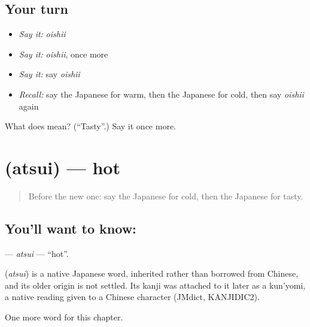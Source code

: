 \subsection*{Your turn}
\begin{itemize}
\raggedright
  \item \emph{Say it:} \emph{oishii}
  \item \emph{Say it:} \emph{oishii}, once more
  \item \emph{Say it:} say \emph{oishii}
  \item \emph{Recall:} say the Japanese for warm, then the Japanese for cold, then say \emph{oishii} again
\end{itemize}

\begin{tcolorbox}[breakable,colback=teal!4,colframe=teal!35!black,title={Before you move on}]
What does  mean? (\textquotedblleft{}Tasty\textquotedblright{}.) Say it once more.
\end{tcolorbox}
\section[\texorpdfstring{\ja{あつい} (atsui)}{あつい (atsui)}]{ (atsui) — hot}

\label{lesson:JA-C53-atsui}



\begin{quote}
Before the new one: say the Japanese for cold, then the Japanese for tasty.
\end{quote}

\subsection*{You'll want to know: }
\textbf{} — \emph{atsui} — \textquotedblleft{}hot\textquotedblright{}.

\begin{cousinweb}
\textbf{} (\emph{atsui}) is a native Japanese word, inherited rather than borrowed from Chinese, and its older origin is not settled. Its kanji was attached to it later as a kun'yomi, a native reading given to a Chinese character (JMdict, KANJIDIC2).
\end{cousinweb}

\begin{grammarlens}[title={What you've built}]
One more word for this chapter.
\end{grammarlens}

